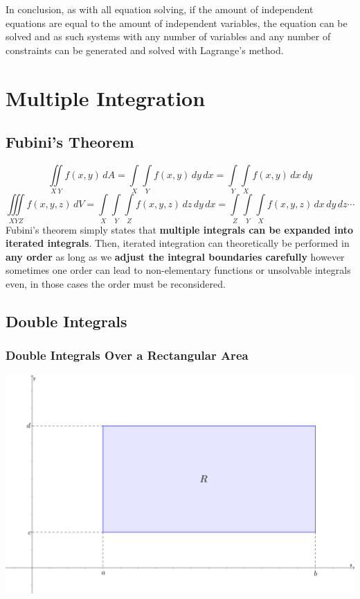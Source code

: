 \documentclass[12pt]{article}
\begin{document}
In conclusion, as with all equation solving, if the amount of independent equations are equal to the amount of independent variables, the equation can be solved and as such systems with any number of variables and any number of constraints can be generated and solved with Lagrange's method.
\newpage
\section{Multiple Integration}
\subsection{Fubini's Theorem}
$$\iint \limits_{X\  Y} f(x,y)\,dA=\int \limits_X \int \limits_Y f(x,y)\,dy\,dx=\int \limits_Y \int \limits_X f(x,y)\,dx\,dy$$
$$\iiint \limits_{XYZ} f(x,y,z)\, dV=\int \limits_X \int \limits_Y \int \limits_Z f(x,y,z)\,dz\,dy\,dx =\int \limits_Z \int \limits_Y \int \limits_X f(x,y,z)\,dx\,dy\,dz \cdots$$
Fubini's theorem simply states that \textbf{multiple integrals can be expanded into iterated integrals}. Then, iterated integration can theoretically be performed in \textbf{any order} as long as we \textbf{adjust the integral boundaries carefully} however sometimes one order can lead to non-elementary functions or unsolvable integrals even, in those cases the order must be reconsidered.
\subsection{Double Integrals}
\subsubsection{Double Integrals Over a Rectangular Area}
\includegraphics[scale=1.48]{Rbox.png}
\end{document}
